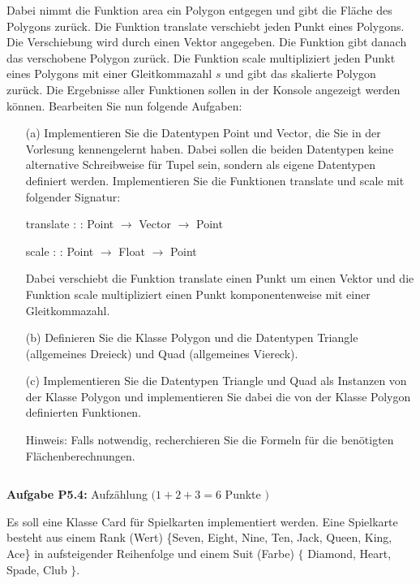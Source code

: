Dabei nimmt die Funktion area ein Polygon entgegen und gibt die Fläche des Polygons zurück. Die Funktion translate 
verschiebt jeden Punkt eines Polygons. Die Verschiebung wird durch einen Vektor angegeben. Die Funktion gibt danach das verschobene 
Polygon zurück. Die Funktion scale multipliziert jeden Punkt eines Polygons mit einer Gleitkommazahl $s$ und gibt das skalierte Polygon 
zurück. Die Ergebnisse aller Funktionen sollen in der Konsole angezeigt werden können. Bearbeiten Sie nun folgende Aufgaben:

\begin{itemize}
  \item [(a)] Implementieren Sie die Datentypen Point und Vector, die Sie in der Vorlesung kennengelernt haben. Dabei sollen die beiden Datentypen keine alternative Schreibweise für Tupel sein, sondern als eigene Datentypen definiert werden. Implementieren Sie die Funktionen translate und scale mit folgender Signatur:

  translate : : Point $\rightarrow$ Vector $\rightarrow$ Point
  
  scale : : Point $\rightarrow$ Float $\rightarrow$ Point
  
  Dabei verschiebt die Funktion translate einen Punkt um einen Vektor und die Funktion scale multipliziert einen Punkt komponentenweise mit einer Gleitkommazahl.

  \item [(b)] Definieren Sie die Klasse Polygon und die Datentypen Triangle (allgemeines Dreieck) und Quad (allgemeines Viereck).

  \item [(c)] Implementieren Sie die Datentypen Triangle und Quad als Instanzen von der Klasse Polygon und implementieren Sie dabei die von der Klasse Polygon definierten Funktionen.

Hinweis: Falls notwendig, recherchieren Sie die Formeln für die benötigten Flächenberechnungen.

\newpage

\inputminted{Haskell}{A5_3.hs}
\end{itemize}

\newpage

\textbf{Aufgabe P5.4:} Aufzählung $(1+2+3=6$ Punkte $)$

Es soll eine Klasse Card für Spielkarten implementiert werden. Eine Spielkarte besteht aus einem Rank (Wert) \{Seven, Eight, Nine, Ten, Jack, Queen, King, Ace\} in aufsteigender Reihenfolge und einem Suit (Farbe) $\{$ Diamond, Heart, Spade, Club $\}$.


